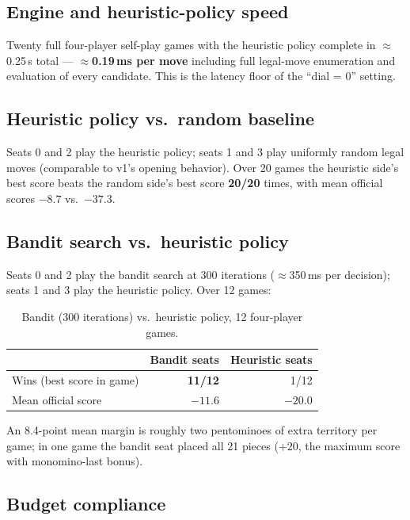 \documentclass[11pt]{article}
\begin{document}
\subsection{Engine and heuristic-policy speed}

Twenty full four-player self-play games with the heuristic policy complete in
$\approx$0.25\,s total --- $\approx$\textbf{0.19\,ms per move} including full
legal-move enumeration and evaluation of every candidate. This is the
latency floor of the ``dial = 0'' setting.

\subsection{Heuristic policy vs.\ random baseline}

Seats 0 and 2 play the heuristic policy; seats 1 and 3 play uniformly random
legal moves (comparable to v1's opening behavior). Over 20 games the
heuristic side's best score beats the random side's best score
\textbf{20/20} times, with mean official scores $-8.7$ vs.\ $-37.3$.

\subsection{Bandit search vs.\ heuristic policy}

Seats 0 and 2 play the bandit search at 300 iterations
($\approx$350\,ms per decision); seats 1 and 3 play the heuristic policy.
Over 12 games:

\begin{table}[h]
\centering
\caption{Bandit (300 iterations) vs.\ heuristic policy, 12 four-player games.}
\begin{tabular}{lrr}
\toprule
 & Bandit seats & Heuristic seats \\
\midrule
Wins (best score in game) & \textbf{11/12} & 1/12 \\
Mean official score & $-11.6$ & $-20.0$ \\
\bottomrule
\end{tabular}
\end{table}

\noindent
An 8.4-point mean margin is roughly two pentominoes of extra territory per
game; in one game the bandit seat placed all 21 pieces ($+20$, the maximum
score with monomino-last bonus).

\subsection{Budget compliance}
\end{document}
